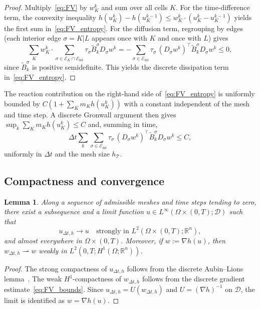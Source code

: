 \documentclass{article}
\newtheorem{lemma}[theorem]{Lemma}
\newcommand{\R}{\mathbb{R}}
\newcommand{\D}{\mathcal{D}}
\newcommand{\Be}{\widetilde{B}}       %
\begin{document}
\begin{proof}
Multiply~\eqref{eq:FV} by $w^k_K$ and sum over all cells $K$. For the
time-difference term, the convexity inequality
$h(u^k_K)-h(u^{k-1}_K)\le w^k_K\cdot(u^k_K-u^{k-1}_K)$
yields the first sum in~\eqref{eq:FV_entropy}. For the diffusion term,
regrouping by edges (each interior edge $\sigma=K|L$ appears once with
$K$ and once with $L$) gives
\[
  \sum_K w^k_K\cdot\!\sum_{\sigma\in\mathcal{E}_K\cap\mathcal{E}_{\mathrm{int}}}
    \tau_\sigma\Be^\sigma_k D_\sigma w^k
  = -\sum_{\sigma\in\mathcal{E}_{\mathrm{int}}}
    \tau_\sigma\,(D_\sigma w^k)^\top\Be^\sigma_k D_\sigma w^k \le 0,
\]
since $\Be^\sigma_k$ is positive semidefinite. This yields the discrete
dissipation term in~\eqref{eq:FV_entropy}.
\end{proof}

The reaction contribution on the right-hand side of~\eqref{eq:FV_entropy}
is uniformly bounded by $C(1+\sum_K m_K h(u^k_K))$ with a constant
independent of the mesh and time step. A discrete Gronwall argument then
gives $\sup_k\sum_K m_K h(u^k_K)\le C$ and, summing in time,
\begin{equation}\label{eq:FV_bounds}
  \Delta t\sum_k
  \sum_{\sigma\in\mathcal{E}_{\mathrm{int}}}
    \tau_\sigma\,(D_\sigma w^k)^\top\Be^\sigma_k D_\sigma w^k \le C,
\end{equation}
uniformly in $\Delta t$ and the mesh size $h_{\mathcal{T}}$.

\subsection{Compactness and convergence}

\begin{lemma}\label{lem:FV_compact}
Along a sequence of admissible meshes and time steps tending to zero,
there exist a subsequence and a limit function
$u\in L^\infty(\Omega\times(0,T);\D)$ such that
\[
  u_{\Delta t,h}\to u \quad\text{strongly in }L^2(\Omega\times(0,T);\R^n),
\]
and almost everywhere in $\Omega\times(0,T)$. Moreover, if
$w:=\nabla h(u)$, then $w_{\Delta t,h}\rightharpoonup w$ weakly in
$L^2(0,T;H^1(\Omega;\R^n))$.
\end{lemma}

\begin{proof}
The strong compactness of $u_{\Delta t,h}$ follows from the discrete
Aubin--Lions lemma~\cite{EymardGallouetHerbich2002,BessemoulinFilbet2012}.
The weak $H^1$-compactness of $w_{\Delta t,h}$ follows from the discrete
gradient estimate~\eqref{eq:FV_bounds}. Since $u_{\Delta t,h}=U(w_{\Delta t,h})$
and $U=(\nabla h)^{-1}$ on $\D$, the limit is identified as
$w=\nabla h(u)$.
\end{proof}
\end{document}
